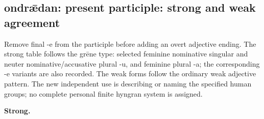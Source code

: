 \subsection*{ondrǣdan: present participle: strong and weak agreement}

Remove final -e from the participle before adding an overt adjective ending. The strong table follows the grēne type: selected feminine nominative singular and neuter nominative/\allowbreak{}accusative plural -u, and feminine plural -a; the corresponding -e variants are also recorded. The weak forms follow the ordinary weak adjective pattern. The new independent use is describing or naming the specified human groups; no complete personal finite hyngran system is assigned.

\textbf{Strong.}

